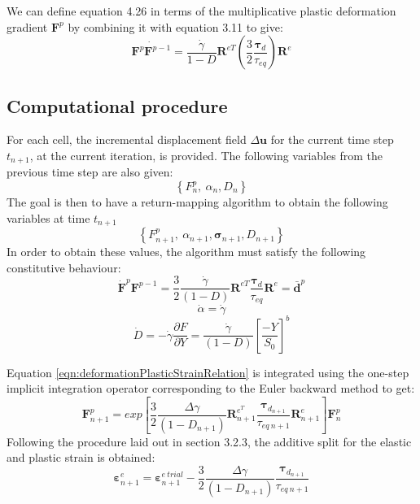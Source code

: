 \documentclass[sn-mathphys,Numbered,draft]{sn-jnl}%
\begin{document}
We can define equation 4.26 in terms of the multiplicative plastic deformation gradient $\mathbf{F}^p$ by combining it with equation 3.11 to give:
 \begin{equation}
	\dot{\mathbf{F}^p\mathbf{F}^{p-1}}=\frac{\dot{\gamma}}{1-D}\mathbf{R}^{eT}\left(\frac{3}{2}\frac{\boldsymbol{\tau}_d}{\tau_{eq}}\right)\mathbf{R}^e
\end{equation}

\subsection{Computational procedure}
For each cell, the incremental displacement field $\Delta\boldsymbol{u}$ for the current time step $t_{n+1}$, at the current iteration, is provided. The following variables from the previous time step are also given:
 \begin{equation}
\left\{F_n^p,\ \alpha_n,D_n\right\}
\end{equation}
The goal is then to have a return-mapping algorithm to obtain the following variables at time $t_{n+1}$
\begin{equation}
\left\{F_{n+1}^p,\ \alpha_{n+1},\boldsymbol{\sigma}_{n+1},D_{n+1}\right\}
\end{equation}
In order to obtain these values, the algorithm must satisfy the following constitutive behaviour:
\begin{equation}
\label{eqn:deformationPlasticStrainRelation}
	{\dot{\mathbf{F}}}^p\mathbf{F}^{p-1}=\frac{3}{2}\frac{\dot{\gamma}}{\left(1-D\right)}\mathbf{R}^{eT}\frac{\boldsymbol{\tau}_d}{\tau_{eq}}\mathbf{R}^e={\bar{\mathbf{d}}}^p
\end{equation}
\begin{equation}
	\dot{\alpha}=\dot{\gamma}	
\end{equation}
\begin{equation}
	\dot{D}=-\dot{\gamma}\frac{\partial F}{\partial Y}=\frac{\dot{\gamma}}{\left(1-D\right)}\left[\frac{-Y}{S_0}\right]^b
\end{equation}



Equation \ref{eqn:deformationPlasticStrainRelation} is integrated using the one-step implicit integration operator corresponding to the Euler backward method to get:
\begin{equation}
	\mathbf{F}_{n+1}^p=exp\left[\frac{3}{2}\frac{\Delta\gamma}{\left(1-D_{n+1}\right)}\mathbf{R}_{n+1}^{e^T}\frac{\boldsymbol{\tau}_{d_{n+1}}}{\tau_{eq\ n+1}}\mathbf{R}_{n+1}^e\right]\mathbf{F}_{n}^p
\end{equation}
Following the procedure laid out in section 3.2.3, the additive split for the elastic and plastic strain is obtained:
\begin{equation}
	\boldsymbol{\varepsilon}_{n+1}^e=\boldsymbol{\varepsilon}_{n+1}^{e\ trial}-\frac{3}{2}\frac{\Delta\gamma}{\left(1-D_{n+1}\right)}\frac{\boldsymbol{\tau}_{d_{n+1}}}{\tau_{eq\ n+1}}
\end{equation}
\end{document}
